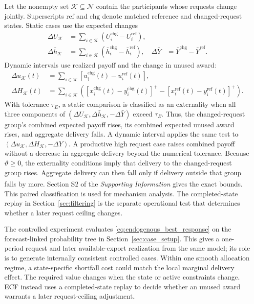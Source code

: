 \documentclass[twoside,twocolumn,9pt]{article}
\newcommand{\suppref}{\textit{Supporting Information}\textsuperscript{\dag}}
\begin{document}
{Let the nonempty set $\mathcal K\subseteq\mathcal N$ contain the participants
whose requests change jointly. Superscripts $\mathrm{ref}$ and $\mathrm{chg}$
denote matched reference and changed-request states. Static cases use the expected
changes
\begin{align}
\Delta U_{\mathcal K}
&=\sum_{i\in\mathcal K}(U_i^{\mathrm{chg}}-U_i^{\mathrm{ref}}),\nonumber\\
\Delta\bar h_{\mathcal K}
&=\sum_{i\in\mathcal K}
(\bar h_i^{\mathrm{chg}}-\bar h_i^{\mathrm{ref}}),
&\Delta\bar Y&=\bar Y^{\mathrm{chg}}-\bar Y^{\mathrm{ref}}.
\label{eq:expected_group_classification_changes}
\end{align}
Dynamic intervals use realized payoff and the change in unused award:
\begin{align}
\Delta u_{\mathcal K}(t)
&=\sum_{i\in\mathcal K}
[u_i^{\mathrm{chg}}(t)-u_i^{\mathrm{ref}}(t)],\nonumber\\
\Delta H_{\mathcal K}(t)
&=\mathop{\sum}_{i\in\mathcal K}\!\left(
[x_i^{\mathrm{chg}}(t)-y_i^{\mathrm{chg}}(t)]^+
-[x_i^{\mathrm{ref}}(t)-y_i^{\mathrm{ref}}(t)]^+\right).
\label{eq:realized_group_classification_changes}
\end{align}
With tolerance $\tau_E$, a static comparison is classified as an externality
when all three components of
$(\Delta U_{\mathcal K},\Delta\bar h_{\mathcal K},-\Delta\bar Y)$ exceed
$\tau_E$. Thus, the changed-request group's combined expected payoff rises, its
combined expected unused award rises, and aggregate delivery falls. A dynamic interval applies the same test to
$(\Delta u_{\mathcal K},\Delta H_{\mathcal K},-\Delta Y)$. A productive high
request case raises combined payoff without a decrease in aggregate delivery
beyond the numerical tolerance. Because $\vartheta\ge0$, the externality
conditions imply that delivery to the changed-request group rises. Aggregate
delivery can then fall only if delivery outside that group falls by more.
Section S2 of the \suppref{} gives the exact bounds. This paired classification
is used for mechanism analysis. The completed-state replay in
Section~\ref{sec:filtering} is the separate operational test that determines
whether a later request ceiling changes.

The controlled experiment evaluates \eqref{eq:endogenous_best_response} on the
forecast-linked probability tree in Section~\ref{sec:case_setup}. This gives a
one-period request and later available-export realization from the same model;
its role is to generate internally consistent controlled cases. Within one
smooth allocation regime, a state-specific shortfall cost could match the local
marginal delivery effect. The required value changes when the state or active
constraints change. ECF instead uses a completed-state replay to decide
whether an unused award warrants a later request-ceiling adjustment.

}
\end{document}
